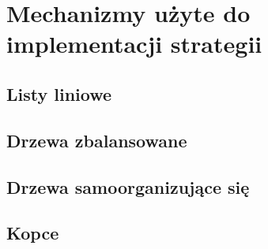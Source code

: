 \section{Mechanizmy użyte do implementacji strategii}

\subsection{Listy liniowe}

\subsection{Drzewa zbalansowane}

\subsection{Drzewa samoorganizujące się}

\subsection{Kopce}

